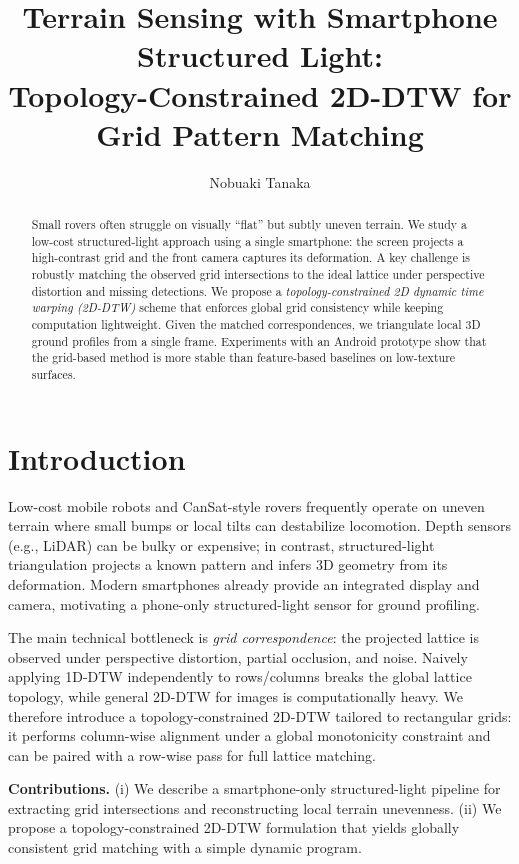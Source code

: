 \documentclass[runningheads]{llncs}
\title{Terrain Sensing with Smartphone Structured Light:\\
Topology-Constrained 2D-DTW for Grid Pattern Matching}
\author{Nobuaki Tanaka}
\institute{Meiji University\\ \email{ev250024@meiji.ac.jp}}
\begin{document}
\maketitle

\begin{abstract}
Small rovers often struggle on visually ``flat'' but subtly uneven terrain.
We study a low-cost structured-light approach using a single smartphone:
the screen projects a high-contrast grid and the front camera captures its deformation.
A key challenge is robustly matching the observed grid intersections to the ideal lattice under
perspective distortion and missing detections.
We propose a \emph{topology-constrained 2D dynamic time warping (2D-DTW)} scheme that enforces
global grid consistency while keeping computation lightweight.
Given the matched correspondences, we triangulate local 3D ground profiles from a single frame.
Experiments with an Android prototype show that the grid-based method is more stable than
feature-based baselines on low-texture surfaces.
\end{abstract}

\section{Introduction}
Low-cost mobile robots and CanSat-style rovers frequently operate on uneven terrain where small bumps
or local tilts can destabilize locomotion.
Depth sensors (e.g., LiDAR) can be bulky or expensive; in contrast, structured-light triangulation
projects a known pattern and infers 3D geometry from its deformation.
Modern smartphones already provide an integrated display and camera, motivating a phone-only
structured-light sensor for ground profiling.

The main technical bottleneck is \emph{grid correspondence}:
the projected lattice is observed under perspective distortion, partial occlusion, and noise.
Naively applying 1D-DTW independently to rows/columns breaks the global lattice topology, while
general 2D-DTW for images is computationally heavy.
We therefore introduce a topology-constrained 2D-DTW tailored to rectangular grids:
it performs column-wise alignment under a global monotonicity constraint and can be paired with a
row-wise pass for full lattice matching.

\textbf{Contributions.}
(i) We describe a smartphone-only structured-light pipeline for extracting grid intersections and reconstructing
local terrain unevenness.
(ii) We propose a topology-constrained 2D-DTW formulation that yields globally consistent grid matching
with a simple dynamic program.
\end{document}
